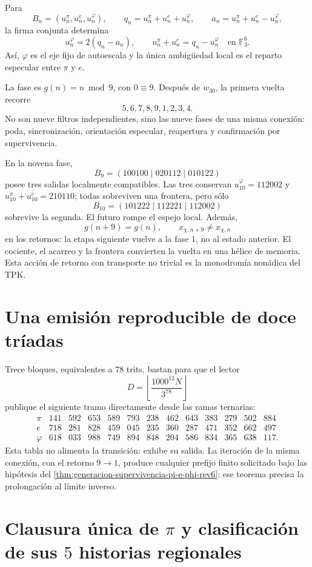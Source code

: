 Para
\[
B_n=(u_n^\pi,u_n^e,u_n^\varphi),\qquad
q_n=u_n^\pi+u_n^e+u_n^\varphi,\qquad
a_n=u_n^\pi+u_n^e-u_n^\varphi,
\]
la firma conjunta determina
\[
u_n^\varphi=2(q_n-a_n),\qquad
u_n^\pi+u_n^e=q_n-u_n^\varphi
\quad\text{en }\mathbb F_3^6.
\]
Así, \(\varphi\) es el eje fijo de autoescala y la única ambigüedad local
es el reparto especular entre \(\pi\) y \(e\).

La fase es \(g(n)=n\bmod9\), con \(0\equiv9\). Después de \(w_{30}\), la
primera vuelta recorre
\[
5,6,7,8,9,1,2,3,4.
\]
No son nueve filtros independientes, sino las nueve fases de una misma
conexión: poda, sincronización, orientación especular, reapertura y
confirmación por supervivencia.

En la novena fase,
\[
B_9=(100100\mid020112\mid010122)
\]
posee tres salidas localmente compatibles. Las tres conservan
\(u_{10}^\varphi=112002\) y
\(u_{10}^\pi+u_{10}^e=210110\); todas sobreviven una frontera, pero sólo
\[
\boxed{B_{10}=(101222\mid112221\mid112002)}
\]
sobrevive la segunda. El futuro rompe el espejo local. Además,
\[
g(n+9)=g(n),\qquad x_{\chi,n+9}\ne x_{\chi,n}
\]
en los retornos: la etapa siguiente vuelve a la fase \(1\), no al estado
anterior. El cociente, el acarreo y la frontera convierten la vuelta en una
hélice de memoria. Esta acción de retorno con transporte no trivial es la
monodromía nonádica del TPK.

\section{Una emisión reproducible de doce tríadas}

Trece bloques, equivalentes a \(78\) trits, bastan para que el lector
\[
D=\left\lfloor\frac{1000^{12}N}{3^{78}}\right\rfloor
\]
publique el siguiente tramo directamente desde las ramas ternarias:
\[
\begin{array}{c|rrrrrrrrrrrr}
\pi&141&592&653&589&793&238&462&643&383&279&502&884\\
e&718&281&828&459&045&235&360&287&471&352&662&497\\
\varphi&618&033&988&749&894&848&204&586&834&365&638&117.
\end{array}
\]
Esta tabla no alimenta la transición: exhibe su salida. La iteración de la
misma conexión, con el retorno \(9\to1\), produce cualquier prefijo finito
solicitado bajo las hipótesis del
\cref{thm:generacion-supervivencia-pi-e-phi-rev6}; ese teorema precisa la
prolongación al límite inverso.

\section{Clausura única de \texorpdfstring{\(\pi\)}{pi} y clasificación de sus \(5\) historias regionales}

